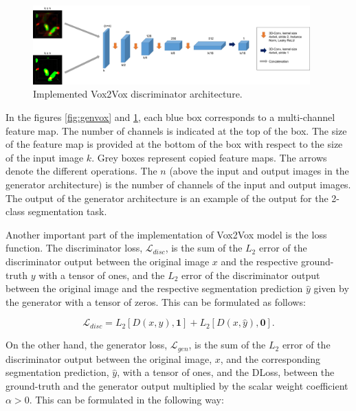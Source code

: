 \begin{figure}[!htb]
  \centering
  \includegraphics[width=0.95\textwidth]{Images/discriminator_vox.jpg}
  \caption[Implemented Vox2Vox discriminator architecture.]{Implemented Vox2Vox discriminator architecture.}
  \label{fig:discvox}
\end{figure}

In the figures \ref{fig:genvox} and \ref{fig:discvox}, each blue box corresponds to a multi-channel feature map. The number of channels is indicated at the top of the box. The size of the feature map is provided at the bottom of the box with respect to the size of the input image $k$. Grey boxes represent copied feature maps. The arrows denote the different operations. The $n$ (above the input and output images in the generator architecture) is the number of channels of the input and output images. The output of the generator architecture is an example of the output for the 2-class segmentation task.

Another important part of the implementation of Vox2Vox model is the loss function. The discriminator loss, $\mathcal{L}_{disc}$, is the sum of the $L_2$ error of the discriminator output between the original image $x$ and the respective ground-truth $y$ with a tensor of ones, and the $L_2$ error of the discriminator output between the original image and the respective segmentation prediction $\hat{y}$ given by the generator with a tensor of zeros. This can be formulated as follows:

\begin{equation}
    \mathcal{L}_{disc} = L_2[D(x,y),\boldsymbol{1}] + L_2[D(x,\hat{y}),\boldsymbol{0}].
\end{equation}

On the other hand, the generator loss, $\mathcal{L}_{gen}$, is the sum of the $L_2$ error of the discriminator output between the original image, $x$, and the corresponding segmentation prediction, $\hat{y}$, with a tensor of ones, and the \ac{DLoss}, between the ground-truth and the generator output multiplied by the scalar weight coefficient $\alpha > 0$. This can be formulated in the following way:

